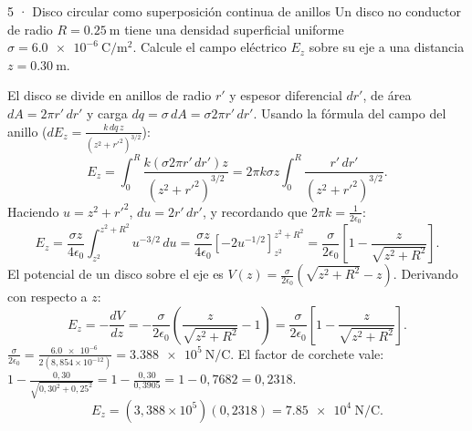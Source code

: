 \documentclass[11pt]{article}
\begin{document}
\begin{eResuelto}{5 · Disco circular como superposición continua de anillos}
Un disco no conductor de radio $R=\SI{0,25}{\metre}$ tiene una densidad superficial uniforme $\sigma=\SI{6,0e-6}{\coulomb\per\metre\squared}$. Calcule el campo eléctrico $E_z$ sobre su eje a una distancia $z=\SI{0,30}{\metre}$.
\begin{center}
\end{center}
El disco se divide en anillos de radio $r'$ y espesor diferencial $dr'$, de área $dA=2\pi r'\,dr'$ y carga $dq=\sigma\,dA=\sigma 2\pi r'\,dr'$.
Usando la fórmula del campo del anillo ($dE_z=\frac{k\,dq\,z}{(z^2+r'^2)^{3/2}}$):
\[ E_z = \int_{0}^{R}\frac{k(\sigma 2\pi r'\,dr')z}{(z^2+r'^2)^{3/2}} = 2\pi k\sigma z\int_{0}^{R}\frac{r'\,dr'}{(z^2+r'^2)^{3/2}}. \]
Haciendo $u=z^2+r'^2$, $du=2r'\,dr'$, y recordando que $2\pi k = \frac{1}{2\epsilon_0}$:
\[ E_z = \frac{\sigma z}{4\epsilon_0}\int_{z^2}^{z^2+R^2}u^{-3/2}\,du = \frac{\sigma z}{4\epsilon_0}\left[-2u^{-1/2}\right]_{z^2}^{z^2+R^2} = \frac{\sigma}{2\epsilon_0}\left[1 - \frac{z}{\sqrt{z^2+R^2}}\right]. \]
El potencial de un disco sobre el eje es $V(z)=\frac{\sigma}{2\epsilon_0}\left(\sqrt{z^2+R^2}-z\right)$.
Derivando con respecto a $z$:
\[ E_z = -\frac{dV}{dz} = -\frac{\sigma}{2\epsilon_0}\left(\frac{z}{\sqrt{z^2+R^2}}-1\right) = \frac{\sigma}{2\epsilon_0}\left[1 - \frac{z}{\sqrt{z^2+R^2}}\right]. \]
$\frac{\sigma}{2\epsilon_0}=\frac{\SI{6,0e-6}{}}{2(8{,}854\times10^{-12})}=\SI{3,388e5}{\newton\per\coulomb}$.
El factor de corchete vale: $1 - \frac{0{,}30}{\sqrt{0{,}30^2+0{,}25^2}} = 1 - \frac{0{,}30}{0{,}3905} = 1 - 0{,}7682 = 0{,}2318$.
\[ E_z = (3{,}388\times10^5)(0{,}2318) = \SI{7,85e4}{\newton\per\coulomb}. \]
\end{eResuelto}
\end{document}

